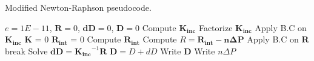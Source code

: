 \documentclass{article}
\begin{document}
\begin{algorithm}[ht]
\caption{Modified Newton-Raphson pseudocode.}
\begin{algorithmic} 
\ENSURE $e = 1E-11$, $\boldsymbol{R} = 0$, $\boldsymbol{dD} = 0$,  $\boldsymbol{D} = 0$
    \STATE Compute $\boldsymbol{K_{inc}}$
    \STATE Factorize $\boldsymbol{K_{inc}}$
    \STATE Apply B.C on $\boldsymbol{K_{inc}}$
        \STATE $\boldsymbol{K}$ = 0
        \STATE $\boldsymbol{R_{int}}$ = 0
        \STATE Compute $\boldsymbol{R_{int}}$
        \STATE Compute $R = \boldsymbol{R_{int} - n \Delta P}$
        \STATE Apply B.C on $\boldsymbol{R}$
            \STATE break
        \ENDIF
        \STATE Solve $\boldsymbol{dD} = \boldsymbol{K_{inc}}^{-1} \boldsymbol{R}$
        \STATE $\boldsymbol{D} = D + dD$
    \ENDFOR
    \STATE Write $\boldsymbol{D}$
    \STATE Write $n \Delta P$
\ENDFOR
\end{algorithmic}
\label{alg:mnr}
\end{algorithm}
\end{document}
